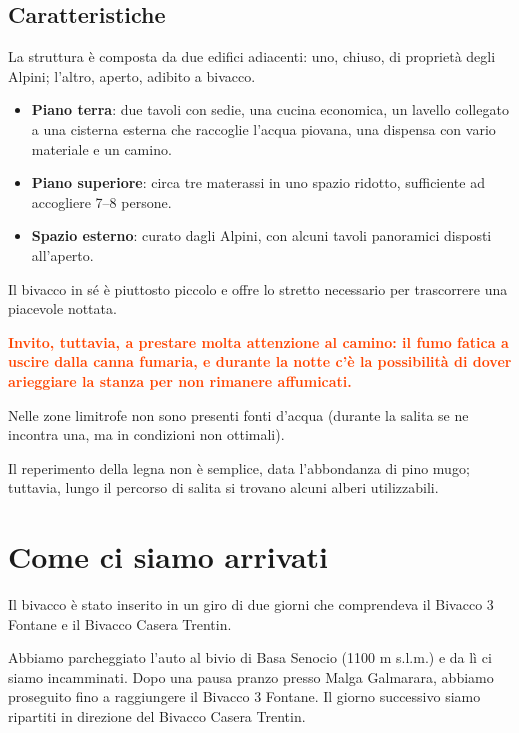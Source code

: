 \documentclass{article}
\begin{document}
\subsection{Caratteristiche}

La struttura è composta da due edifici adiacenti: uno, chiuso, di proprietà degli Alpini; l’altro, aperto, adibito a bivacco.  
\begin{itemize}
    \item \textbf{Piano terra}: due tavoli con sedie, una cucina economica, un lavello collegato a una cisterna esterna che raccoglie l’acqua piovana, una dispensa con vario materiale e un camino.
    \item \textbf{Piano superiore}: circa tre materassi in uno spazio ridotto, sufficiente ad accogliere 7–8 persone.
    \item \textbf{Spazio esterno}: curato dagli Alpini, con alcuni tavoli panoramici disposti all’aperto. 
\end{itemize}

Il bivacco in sé è piuttosto piccolo e offre lo stretto necessario per trascorrere una piacevole nottata.  

\textbf{\textcolor{OrangeRed}{Invito, tuttavia, a prestare molta attenzione al camino: il fumo fatica a uscire dalla canna fumaria, e durante la notte c'è la possibilità di dover arieggiare la stanza per non rimanere affumicati.}}

Nelle zone limitrofe non sono presenti fonti d’acqua (durante la salita se ne incontra una, ma in condizioni non ottimali). 

Il reperimento della legna non è semplice, data l’abbondanza di pino mugo; tuttavia, lungo il percorso di salita si trovano alcuni alberi utilizzabili.


\section{Come ci siamo arrivati}
Il bivacco è stato inserito in un giro di due giorni che comprendeva il Bivacco 3 Fontane e il Bivacco Casera Trentin.

Abbiamo parcheggiato l’auto al bivio di Basa Senocio (1100 m s.l.m.) e da lì ci siamo incamminati. Dopo una pausa pranzo presso Malga Galmarara, abbiamo proseguito fino a raggiungere il Bivacco 3 Fontane. Il giorno successivo siamo ripartiti in direzione del Bivacco Casera Trentin.
\end{document}
